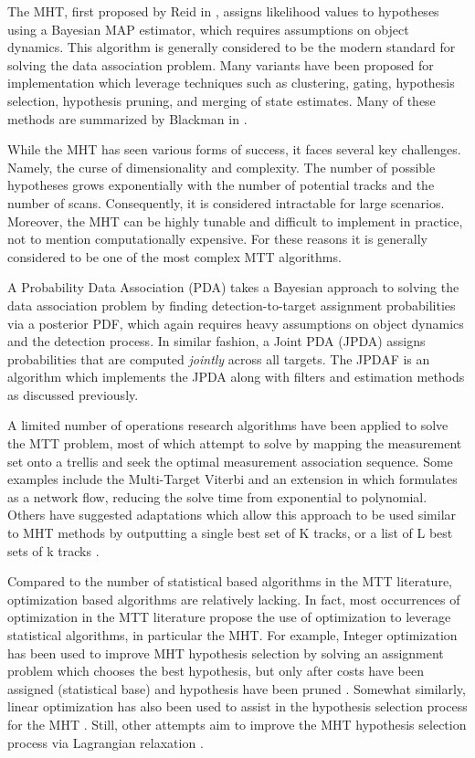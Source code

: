 \documentclass[journal]{IEEEtran}
\begin{document}
The MHT, first proposed by Reid in \cite{MHT-Seminal}, assigns likelihood values to hypotheses using a Bayesian MAP estimator, which requires assumptions on object dynamics. This algorithm is generally considered to be the modern standard for solving the data association problem. Many variants have been proposed for implementation which leverage techniques such as clustering, gating, hypothesis selection, hypothesis pruning, and merging of state estimates. Many of these methods are summarized by Blackman in \cite{MHT-Overview}. 

While the MHT has seen various forms of success, it faces several key challenges. Namely, the curse of dimensionality and complexity. The number of possible hypotheses grows exponentially with the number of potential tracks and the number of scans. Consequently, it is considered intractable for large scenarios. Moreover, the MHT can be highly tunable and difficult to implement in practice, not to mention computationally expensive. For these reasons it is generally considered to be one of the most complex MTT algorithms. 

A Probability Data Association (PDA) takes a Bayesian approach to solving the data association problem by finding detection-to-target assignment probabilities via a posterior PDF, which again requires heavy assumptions on object dynamics and the detection process. In similar fashion, a Joint PDA (JPDA) assigns probabilities that are computed \textit{jointly} across all targets. The JPDAF is an algorithm which implements the JPDA along with filters and estimation methods as discussed previously. \cite{Bar-Shalom_MTT} 

A limited number of operations research algorithms have been applied to solve the MTT problem, most of which attempt to solve by mapping the measurement set onto a trellis and seek the optimal measurement association sequence. Some examples include the Multi-Target Viterbi\cite{Viterbi-1} and an extension in \cite{Viterbi-2} which formulates \cite{Viterbi-1} as a network flow, reducing the solve time from exponential to polynomial. Others have suggested adaptations which allow this approach to be used similar to MHT methods by outputting a single best set of K tracks, or a list of L best sets of k tracks \cite{Viterbi-3}. 

Compared to the number of statistical based algorithms in the MTT literature, optimization based algorithms are relatively lacking. In fact, most occurrences of optimization in the MTT literature propose the use of optimization to leverage statistical algorithms, in particular the MHT. For example, Integer optimization has been used to improve MHT hypothesis selection by solving an assignment problem which chooses the best hypothesis, but only after costs have been assigned (statistical base) and hypothesis have been pruned \cite{MHT-IP}. Somewhat similarly, linear optimization has also been used to assist in the hypothesis selection process for the MHT \cite{MHT-LP}. Still, other attempts aim to improve the MHT hypothesis selection process via Lagrangian relaxation \cite{Lagrangian}. 
\end{document}
